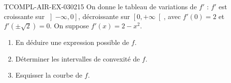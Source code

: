 \begin{exercice}{TCOMPL-AIR-EX-030}{2}{15}
On donne le tableau de variations de $f'$ : $f'$ est croissante sur $\left]-\infty, 0\right]$, décroissante sur $\left[0, +\infty\right[$, avec $f'(0) = 2$ et $f'(\pm\sqrt{2}) = 0$. On suppose $f'(x) = 2 - x^2$.
\begin{enumerate}
  \item En déduire une expression possible de $f$.
  \item Déterminer les intervalles de convexité de $f$.
  \item Esquisser la courbe de $f$.
\end{enumerate}

\end{exercice}
